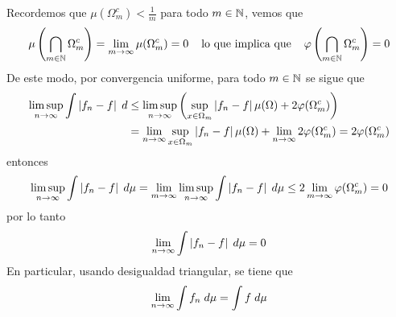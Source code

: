 \documentclass{article}
\begin{document}
Recordemos que $\mu(\Omega_{m}^{c})<\frac{1}{m}$ para todo $m\in\mathbb{N}$, vemos que
\begin{equation*}
    \mu\left(\bigcap_{m\in\mathbb{N}}\Omega_{m}^{c}\right)=\lim\limits_{m\to\infty}\mu(\Omega_{m}^{c})=0
    \hspace{4mm}\text{lo que implica que}\hspace{4mm}\varphi\left(\bigcap_{m\in\mathbb{N}}\Omega_{m}^{c}
    \right)=0
\end{equation*}
De este modo, por convergencia uniforme, para todo $m\in\mathbb{N}$ se sigue que
\begin{align*}
    \limsup\limits_{n\to\infty}\int\left|f_{n}-f \right|\hspace{1mm}d &\leq
    \limsup\limits_{n\to\infty}\left(\sup_{x\in\Omega_{m}}\left|f_{n}-f \right|\mu(\Omega)
    +2\varphi(\Omega_{m}^{c})\right) \\
    &=\lim\limits_{n\to\infty}\sup_{x\in\Omega_{m}}\left|f_{n}-f \right|\mu(\Omega)
    +\lim\limits_{n\to\infty}2\varphi(\Omega_{m}^{c})=2\varphi(\Omega_{m}^{c})
\end{align*}
entonces
\begin{equation*}
    \limsup\limits_{n\to\infty}\int\left|f_{n}-f \right|\hspace{1mm}d\mu
    =\lim\limits_{m\to\infty}\limsup\limits_{n\to\infty}\int\left|f_{n}-f \right|\hspace{1mm}d\mu
    \leq2\lim\limits_{m\to\infty}\varphi(\Omega_{m}^{c})=0
\end{equation*}
por lo tanto
\begin{equation*}
    \lim\limits_{n\to\infty}\int\left|f_{n}-f \right|\hspace{1mm}d\mu=0
\end{equation*}
En particular, usando desigualdad triangular, se tiene que
\begin{equation*}
    \lim\limits_{n\to\infty}\int f_{n}\hspace{1mm}d\mu=\int f\hspace{1mm}d\mu
\end{equation*}
\end{document}
